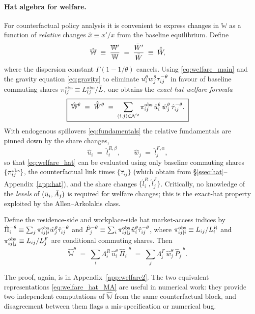 \paragraph{Hat algebra for welfare.}\label{ssec:welfare_hat}
For counterfactual policy analysis it is convenient to express
changes in $\mathbb W$ as a function of \emph{relative} changes
$\hat x\equiv x'/x$ from the baseline equilibrium.  Define
\begin{equation}
  \hat{\mathbb W}\;\equiv\;\frac{\mathbb W'}{\mathbb W}
  \;=\;\frac{\bar W'}{\bar W}\;\equiv\;\hat{\bar W},
  \label{eq:Whatdef}
\end{equation}
where the dispersion constant $\Gamma(1-1/\theta)$ cancels.  Using
\eqref{eq:welfare_main} and the gravity equation
\eqref{eq:gravity} to eliminate $u_i^{\theta}w_j^{\theta}\tau_{ij}^{-\theta}$
in favour of baseline commuting shares
$\pi_{ij}^{\mathrm{obs}}\equiv L_{ij}^{\mathrm{obs}}/\bar L$, one obtains the
\emph{exact-hat welfare formula}
\begin{equation}
  \boxed{\;\hat{\mathbb W}^{\theta}
  \;=\;\hat{\bar W}^{\theta}
  \;=\;\sum_{(i,j)\in\mathcal N^{2}}
        \pi_{ij}^{\mathrm{obs}}\,
        \hat{u}_i^{\theta}\,\hat{w}_j^{\theta}\,\hat{\tau}_{ij}^{-\theta}.\;}
  \label{eq:welfare_hat}
\end{equation}
With endogenous spillovers \eqref{eq:fundamentals} the relative
fundamentals are pinned down by the share changes,
\begin{equation}
  \hat u_i\;=\;\hat l_i^{R,\beta},
  \qquad
  \hat w_j\;=\;\hat l_j^{F,\alpha},
  \label{eq:hat_uw}
\end{equation}
so that \eqref{eq:welfare_hat} can be evaluated using only baseline
commuting shares $\{\pi_{ij}^{\mathrm{obs}}\}$, the counterfactual link
times $\{\hat{\tau}_{ij}\}$ (which obtain from
\S\ref{ssec:hat}--Appendix~\ref{app:hat}), and the share changes
$\{\hat l_i^R,\hat l_j^F\}$.  Critically, no knowledge of the
\emph{levels} of $(\bar u_i,\bar A_j)$ is required for welfare changes;
this is the exact-hat property exploited by the
Allen--Arkolakis class.

\begin{proposition}
\label{prop:welfare_bounds}
Define the residence-side and workplace-side hat market-access
indices by
$\hat{\Pi}_i^{-\theta}\equiv\sum_{j}\pi_{ij|i}^{\mathrm{obs}}\hat{w}_j^{\theta}\hat{\tau}_{ij}^{-\theta}$
and
$\hat{P}_j^{-\theta}\equiv\sum_{i}\pi_{ij|j}^{\mathrm{obs}}\hat{u}_i^{\theta}\hat{\tau}_{ij}^{-\theta}$,
where $\pi_{ij|i}^{\mathrm{obs}}\equiv L_{ij}/L_i^R$ and
$\pi_{ij|j}^{\mathrm{obs}}\equiv L_{ij}/L_j^F$ are conditional commuting
shares.  Then
\begin{equation}
  \hat{\mathbb W}^{\theta}
  \;=\;\sum_{i}\Lambda_i^R\,\hat u_i^{\theta}\,\hat\Pi_i^{-\theta}
  \;=\;\sum_{j}\Lambda_j^F\,\hat w_j^{\theta}\,\hat P_j^{-\theta}.
  \label{eq:welfare_hat_MA}
\end{equation}
\end{proposition}
\noindent The proof, again, is in
Appendix~\ref{app:welfare2}.  The two equivalent representations
\eqref{eq:welfare_hat_MA} are useful in numerical work: they provide
two independent computations of $\hat{\mathbb W}$ from the same
counterfactual block, and disagreement between them flags a
mis-specification or numerical bug.

